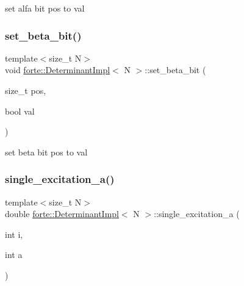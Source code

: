 set alfa bit pos to val 

\mbox{\label{classforte_1_1_determinant_impl_a47f0329c3d05f3aa9785b8bb0b2a55a5}} 
\subsubsection{\texorpdfstring{set\+\_\+beta\+\_\+bit()}{set\_beta\_bit()}}
{\footnotesize\ttfamily template$<$size\+\_\+t N$>$ \\
void \mbox{\hyperlink{classforte_1_1_determinant_impl}{forte\+::\+Determinant\+Impl}}$<$ N $>$\+::set\+\_\+beta\+\_\+bit (\begin{DoxyParamCaption}\item[{size\+\_\+t}]{pos,  }\item[{bool}]{val }\end{DoxyParamCaption})\hspace{0.3cm}{\ttfamily [inline]}}



set beta bit pos to val 

\mbox{\label{classforte_1_1_determinant_impl_a29e9efc18d8346cd7e2809a1e9c8f2a9}} 
\subsubsection{\texorpdfstring{single\+\_\+excitation\+\_\+a()}{single\_excitation\_a()}}
{\footnotesize\ttfamily template$<$size\+\_\+t N$>$ \\
double \mbox{\hyperlink{classforte_1_1_determinant_impl}{forte\+::\+Determinant\+Impl}}$<$ N $>$\+::single\+\_\+excitation\+\_\+a (\begin{DoxyParamCaption}\item[{int}]{i,  }\item[{int}]{a }\end{DoxyParamCaption})\hspace{0.3cm}{\ttfamily [inline]}}

